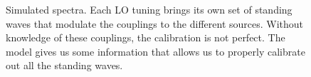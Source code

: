 \documentclass[a4paper,11pt]{article}
\begin{document}
\begin{figure}
    \centering
    \caption{\label{fig:calibrated}Simulated spectra.
    Each LO tuning brings its own set of standing waves that modulate the couplings to the different sources.
    Without knowledge of these couplings, the calibration is not perfect.
    The model gives us some information that allows us to properly calibrate out all the standing waves.}
\end{figure}
\end{document}
